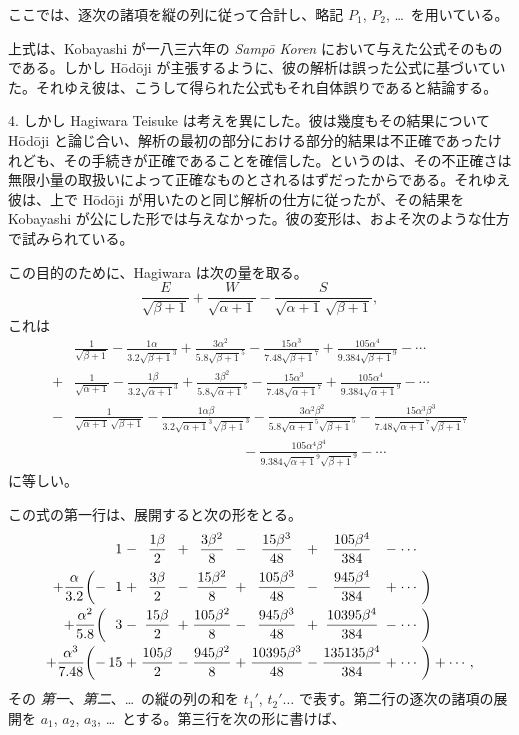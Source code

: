 \documentclass[11pt]{article}
\newcommand{\scanpage}[2]{\clearpage\setcounter{footnote}{0}\noindent{\footnotesize\color{gray}PDF #1 頁 · #2}\par\medskip}
\begin{document}
\scanpage{0333}{印刷頁 319}
\noindent ここでは、逐次の諸項を縦の列に従って合計し、略記 $P_1$, $P_2$, \dots\ を用いている。

上式は、Kobayashi が一八三六年の \emph{Sampō Koren} において与えた公式そのものである。しかし Hōdōji が主張するように、彼の解析は誤った公式に基づいていた。それゆえ彼は、こうして得られた公式もそれ自体誤りであると結論する。

4. しかし Hagiwara Teisuke は考えを異にした。彼は幾度もその結果について Hōdōji と論じ合い、解析の最初の部分における部分的結果は不正確であったけれども、その手続きが正確であることを確信した。というのは、その不正確さは無限小量の取扱いによって正確なものとされるはずだったからである。それゆえ彼は、上で Hōdōji が用いたのと同じ解析の仕方に従ったが、その結果を Kobayashi が公にした形では与えなかった。彼の変形は、およそ次のような仕方で試みられている。

この目的のために、Hagiwara は次の量を取る。
\[
\frac{E}{\sqrt{\beta+1}}+\frac{W}{\sqrt{\alpha+1}}-\frac{S}{\sqrt{\alpha+1}\,\sqrt{\beta+1}},
\]
これは
\[
\begin{aligned}
&\frac{1}{\sqrt{\beta+1}}-\frac{1\alpha}{3.2\sqrt{\beta+1}^{3}}+\frac{3\alpha^{2}}{5.8\sqrt{\beta+1}^{5}}-\frac{15\alpha^{3}}{7.48\sqrt{\beta+1}^{7}}+\frac{105\alpha^{4}}{9.384\sqrt{\beta+1}^{9}}-\cdots\\
+{}&\frac{1}{\sqrt{\alpha+1}}-\frac{1\beta}{3.2\sqrt{\alpha+1}^{3}}+\frac{3\beta^{2}}{5.8\sqrt{\alpha+1}^{5}}-\frac{15\alpha^{3}}{7.48\sqrt{\alpha+1}^{7}}+\frac{105\alpha^{4}}{9.384\sqrt{\alpha+1}^{9}}-\cdots\\
-{}&\frac{1}{\sqrt{\alpha+1}\,\sqrt{\beta+1}}-\frac{1\alpha\beta}{3.2\sqrt{\alpha+1}^{3}\sqrt{\beta+1}^{3}}-\frac{3\alpha^{2}\beta^{2}}{5.8\sqrt{\alpha+1}^{5}\sqrt{\beta+1}^{5}}-\frac{15\alpha^{3}\beta^{3}}{7.48\sqrt{\alpha+1}^{7}\sqrt{\beta+1}^{7}}\\
&\qquad\qquad\qquad\qquad\qquad\qquad-\frac{105\alpha^{4}\beta^{4}}{9.384\sqrt{\alpha+1}^{9}\sqrt{\beta+1}^{9}}-\cdots
\end{aligned}
\]
に等しい。

この式の第一行は、展開すると次の形をとる。
\[
\begin{array}{r@{\,}r@{\;}c@{\;}c@{\;}c@{\;}c@{\;}c@{\;}c@{\;}c@{\;}c@{\;}c@{\;}c@{\,}l}
 & 1 & - & \dfrac{1\beta}{2} & + & \dfrac{3\beta^{2}}{8} & - & \dfrac{15\beta^{3}}{48} & + & \dfrac{105\beta^{4}}{384} & - & \cdots & \\[3mm]
+\dfrac{\alpha}{3.2}\biggl(- & 1 & + & \dfrac{3\beta}{2} & - & \dfrac{15\beta^{2}}{8} & + & \dfrac{105\beta^{3}}{48} & - & \dfrac{945\beta^{4}}{384} & + & \cdots & \biggr)\\[3mm]
+\dfrac{\alpha^{2}}{5.8}\biggl( & 3 & - & \dfrac{15\beta}{2} & + & \dfrac{105\beta^{2}}{8} & - & \dfrac{945\beta^{3}}{48} & + & \dfrac{10395\beta^{4}}{384} & - & \cdots & \biggr)\\[3mm]
+\dfrac{\alpha^{3}}{7.48}\biggl(- & 15 & + & \dfrac{105\beta}{2} & - & \dfrac{945\beta^{2}}{8} & + & \dfrac{10395\beta^{3}}{48} & - & \dfrac{135135\beta^{4}}{384} & + & \cdots & \biggr)+\cdots,
\end{array}
\]
その \emph{第一}、\emph{第二}、\dots\ の縦の列の和を $t_1'$, $t_2'\dots$ で表す。第二行の逐次の諸項の展開を $a_1$, $a_2$, $a_3$, \dots\ とする。第三行を次の形に書けば、
\end{document}

